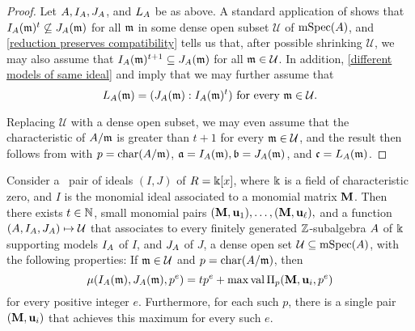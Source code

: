 \documentclass{article}
\begin{document}
\begin{proof}   Let $A, I_A, J_A$, and $L_A$ be as above.  A standard application of  shows that $I_A(\mathfrak{m})^t \not \subseteq J_A(\mathfrak{m})$ for all $\mathfrak{m}$ in some dense open subset $\mathcal{U}$ of $\operatorname{mSpec}(A)$, and \ref{reduction preserves compatibility} tells us that, after possible shrinking $\mathcal{U}$, we may also assume that $I_A(\mathfrak{m})^{t+1} \subseteq J_A(\mathfrak{m})$ for all $\mathfrak{m} \in \mathcal{U}$. In addition,  \ref{different models of same ideal}
 and  imply that we may further assume that 
 \[ L_A(\mathfrak{m}) = (J_A(\mathfrak{m}) : I_A(\mathfrak{m})^t) \text{ for every $\mathfrak{m} \in \mathcal{U}$}. \] 
 
 Replacing $\mathcal{U}$ with a dense open subset, we may even assume that the characteristic of $A/\mathfrak{m}$ is greater than $t+1$ for every $\mathfrak{m} \in \mathcal{U}$, and the result then follows from  with $p = \operatorname{char}(A/\mathfrak{m})$, $\mathfrak{a} = I_A(\mathfrak{m}), \mathfrak{b} = J_A(\mathfrak{m})$, and $\mathfrak{c} = L_A(\mathfrak{m})$.
 \end{proof}


\begin{theorem}
   \label{invariants associated to a monomial ideal in large characteristic: T}   
   Consider a \compatible\ pair of ideals $(I,J)$ of $R=\Bbbk[x]$, where $\Bbbk$ is a field of characteristic zero, and $I$ is the monomial ideal associated to a monomial matrix $\mathbf{M}$.  Then there exists $t \in \mathbb{N}$, small monomial pairs $(\mathbf{M}, \mathbf{u}_1),  \ldots, (\mathbf{M}, \mathbf{u}_{\ell}),$ and a function $(A, I_A, J_A) \mapsto \mathcal{U}$  that associates to every finitely generated $\mathbb{Z}$-subalgebra $A$ of $\Bbbk$ supporting models $I_A$ of $I$, and $J_A$ of $J$, a dense open set $\mathcal{U} \subseteq \operatorname{mSpec}(A)$, with the following properties\textup:
   If $\mathfrak{m} \in \mathcal{U}$ and $p = \operatorname{char}(A/\mathfrak{m})$, then 
   \[
      \mu(I_A(\mathfrak{m}), J_A(\mathfrak{m}), p^e) = tp^e + \max \operatorname{val} \Pi_p(\mathbf{M}, \mathbf{u}_i, p^e) 
   \]
   for every positive integer $e$.
Furthermore, for each such $p$, there is a single pair $(\mathbf{M}, \mathbf{u}_i)$ that achieves this maximum for every such $e$.  
\end{theorem}
\end{document}
